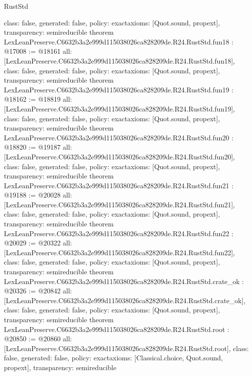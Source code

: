\begin{lexlean}{RustStd}
\begin{coremodule}
{  class: false,
  generated: false,
  policy: exact{axioms: [Quot.sound, propext]},
  transparency: semireducible
}
theorem LexLeanPreserve.C6632b3a2e999d115038026ca828209de.R24.RustStd.fun18 : @17008 := @18161 {
  all: [LexLeanPreserve.C6632b3a2e999d115038026ca828209de.R24.RustStd.fun18],
  class: false,
  generated: false,
  policy: exact{axioms: [Quot.sound, propext]},
  transparency: semireducible
}
theorem LexLeanPreserve.C6632b3a2e999d115038026ca828209de.R24.RustStd.fun19 : @18162 := @18819 {
  all: [LexLeanPreserve.C6632b3a2e999d115038026ca828209de.R24.RustStd.fun19],
  class: false,
  generated: false,
  policy: exact{axioms: [Quot.sound, propext]},
  transparency: semireducible
}
theorem LexLeanPreserve.C6632b3a2e999d115038026ca828209de.R24.RustStd.fun20 : @18820 := @19187 {
  all: [LexLeanPreserve.C6632b3a2e999d115038026ca828209de.R24.RustStd.fun20],
  class: false,
  generated: false,
  policy: exact{axioms: [Quot.sound, propext]},
  transparency: semireducible
}
theorem LexLeanPreserve.C6632b3a2e999d115038026ca828209de.R24.RustStd.fun21 : @19188 := @20028 {
  all: [LexLeanPreserve.C6632b3a2e999d115038026ca828209de.R24.RustStd.fun21],
  class: false,
  generated: false,
  policy: exact{axioms: [Quot.sound, propext]},
  transparency: semireducible
}
theorem LexLeanPreserve.C6632b3a2e999d115038026ca828209de.R24.RustStd.fun22 : @20029 := @20322 {
  all: [LexLeanPreserve.C6632b3a2e999d115038026ca828209de.R24.RustStd.fun22],
  class: false,
  generated: false,
  policy: exact{axioms: [Quot.sound, propext]},
  transparency: semireducible
}
theorem LexLeanPreserve.C6632b3a2e999d115038026ca828209de.R24.RustStd.crate_ok : @20326 := @20842 {
  all: [LexLeanPreserve.C6632b3a2e999d115038026ca828209de.R24.RustStd.crate_ok],
  class: false,
  generated: false,
  policy: exact{axioms: [Quot.sound, propext]},
  transparency: semireducible
}
theorem LexLeanPreserve.C6632b3a2e999d115038026ca828209de.R24.RustStd.root : @20850 := @20860 {
  all: [LexLeanPreserve.C6632b3a2e999d115038026ca828209de.R24.RustStd.root],
  class: false,
  generated: false,
  policy: exact{axioms: [Classical.choice, Quot.sound, propext]},
  transparency: semireducible
}


\end{coremodule}
\end{lexlean}
